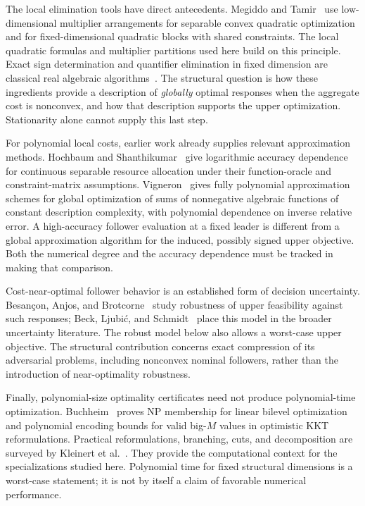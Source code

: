 The local elimination tools have direct antecedents. Megiddo and
Tamir~\cite{MegiddoTamir1993} use low-dimensional multiplier arrangements
for separable convex quadratic optimization and for fixed-dimensional
quadratic blocks with shared constraints. The local quadratic formulas
and multiplier partitions used here build on this principle. Exact sign
determination and quantifier elimination in fixed dimension are classical
real algebraic algorithms~\cite{BasuPollackRoy1996}. The structural question
is how these ingredients provide a description of \emph{globally} optimal
responses when the aggregate cost is nonconvex, and how that description
supports the upper optimization. Stationarity alone cannot supply this
last step.

For polynomial local costs, earlier work already supplies relevant
approximation methods. Hochbaum and Shanthikumar~\cite{HochbaumShanthikumar1990}
give logarithmic accuracy dependence for continuous separable resource
allocation under their function-oracle and constraint-matrix assumptions.
Vigneron~\cite{Vigneron2014} gives fully polynomial approximation schemes
for global optimization of sums of nonnegative algebraic functions of
constant description complexity, with polynomial dependence on inverse
relative error. A high-accuracy follower evaluation at a
fixed leader is different from a global approximation algorithm for the
induced, possibly signed upper objective. Both the numerical degree and
the accuracy dependence must be tracked in making that comparison.

Cost-near-optimal follower behavior is an established form of decision
uncertainty. Besan\c{c}on, Anjos, and Brotcorne~\cite{BesanconAnjosBrotcorne2024}
study robustness of upper feasibility against such responses;
Beck, Ljubi\'c, and Schmidt~\cite{BeckLjubicSchmidt2023} place this model in
the broader uncertainty literature. The robust model below also allows a
worst-case upper objective. The structural contribution concerns exact
compression of its adversarial problems, including nonconvex nominal
followers, rather than the introduction of near-optimality robustness.

Finally, polynomial-size optimality certificates need not produce
polynomial-time optimization. Buchheim~\cite{Buchheim2023} proves NP
membership for linear bilevel optimization and polynomial encoding bounds
for valid big-$M$ values in optimistic KKT reformulations. Practical
reformulations, branching, cuts, and decomposition are surveyed by
Kleinert et al.~\cite{KleinertEtAl2021}. They provide the computational
context for the specializations studied here. Polynomial time for fixed
structural dimensions is a worst-case statement; it is not by itself a
claim of favorable numerical performance.


